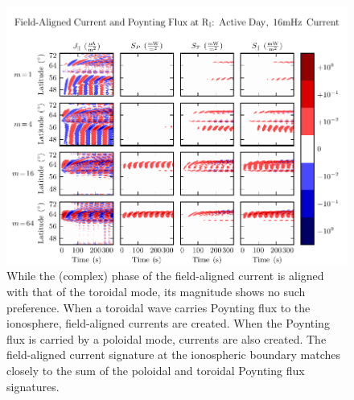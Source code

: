 \begin{figure}[H]
    \centering
    \includegraphics[width=\textwidth]{figures/JS_1_016mHz.pdf}
    \caption[Field-Aligned Current and Poynting Flux at $R_I$: Active Day, \SI{16}{mHz} Current]{
      While the (complex) phase of the field-aligned current is aligned with that of the toroidal mode, its magnitude shows no such preference. When a toroidal wave carries Poynting flux to the ionosphere, field-aligned currents are created. When the Poynting flux is carried by a poloidal mode, currents are also created. The field-aligned current signature at the ionospheric boundary matches closely to the sum of the poloidal and toroidal Poynting flux signatures. 
    }
    \label{fig_JS_1_016mHz}
\end{figure}




